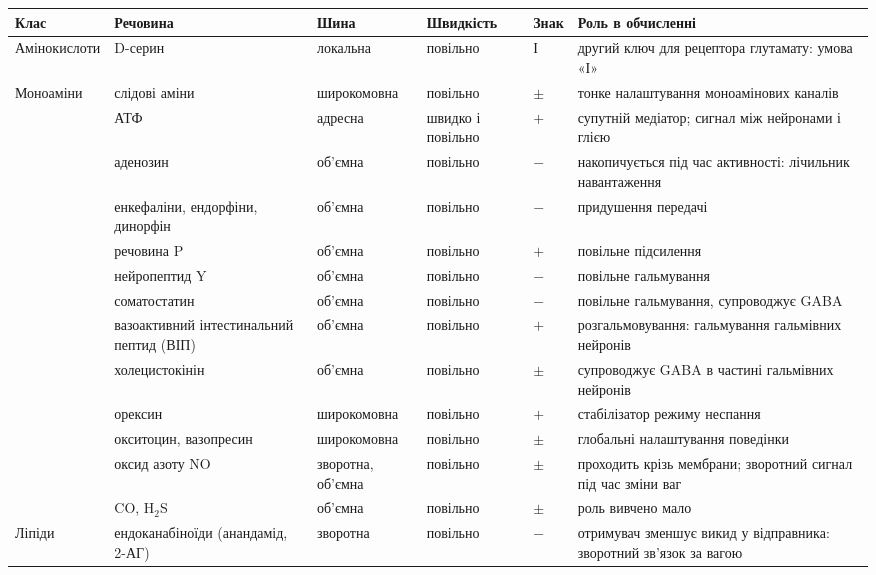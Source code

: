 \begin{table}[t]
\centering
\footnotesize
\setlength{\tabcolsep}{4pt}
\renewcommand{\arraystretch}{1.12}
\begin{tabular}{>{\raggedright}p{2.25cm}>{\raggedright}p{2.8cm}>{\raggedright}p{1.8cm}>{\raggedright}p{1.5cm}>{\centering}p{0.8cm}>{\raggedright\arraybackslash}p{4.3cm}}
\toprule
Клас & Речовина & Шина & Швид\-кість & Знак & Роль в обчисленні \\
\midrule
Амінокислоти & D-серин & локальна & повільно & І & другий ключ для рецептора глутамату: умова «І» \\
\midrule
Моноаміни & слідові аміни & широко\-мовна & повільно & $\pm$ & тонке налаштування моноамінових каналів \\
\midrule
\multirow{2}{2.25cm}{Пурини}
 & АТФ & адресна & швидко і повільно & $+$ & супутній медіатор; сигнал між нейронами і глією \\
 & аденозин & об'ємна & повільно & $-$ & накопичується під час активності: лічильник навантаження~\cite{Dunwiddie2001} \\
\midrule
\multirow{8}{2.25cm}{Нейропептиди (понад сотню)}
 & енкефаліни, ендорфіни, динорфін & об'ємна & повільно & $-$ & придушення передачі \\
 & речовина P & об'ємна & повільно & $+$ & повільне підсилення \\
 & нейропептид Y & об'ємна & повільно & $-$ & повільне гальмування \\
 & соматостатин & об'ємна & повільно & $-$ & повільне гальмування, супроводжує GABA \\
 & вазоактивний інтестинальний пептид (ВІП) & об'ємна & повільно & $+$ & розгальмовування: гальмування гальмівних нейронів \\
 & холецистокінін & об'ємна & повільно & $\pm$ & супроводжує GABA в частині гальмівних нейронів \\
 & орексин & широко\-мовна & повільно & $+$ & стабілізатор режиму неспання \\
 & окситоцин, вазопресин & широко\-мовна & повільно & $\pm$ & глобальні налаштування поведінки \\
\midrule
\multirow{2}{2.25cm}{Гази}
 & оксид азоту NO & зворотна, об'ємна & повільно & $\pm$ & проходить крізь мембрани; зворотний сигнал під час зміни ваг~\cite{Garthwaite2008} \\
 & CO, H$_2$S & об'ємна & повільно & $\pm$ & роль вивчено мало \\
\midrule
Ліпіди & ендоканабіноїди (анандамід, 2-АГ) & зворотна & повільно & $-$ & отримувач зменшує викид у відправника: зворотний зв'язок за вагою~\cite{WilsonNicoll2001} \\

\end{tabular}
\end{table}
